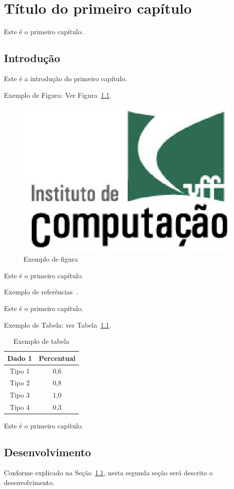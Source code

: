 \chapter{T\'itulo do primeiro cap\'itulo} \label{cap:cap1}

Este \'e o primeiro cap\'itulo. 

\section{Introdu\c{c}\~ao}\label{sec:intro}

Este \'e a introdu\c{c}\~ao do primeiro cap\'itulo. 

Exemplo de Figura: Ver Figura~\ref{fig:exefig}.

\begin{figure}[!ht]
\centering
\includegraphics[width=0.3\linewidth]{figuras/exefig.eps}
\caption{Exemplo de figura}
\label{fig:exefig}
\end{figure}

Este \'e o primeiro cap\'itulo. 

Exemplo de refer\^encias~\cite{tese2011, confinter2011, confnac2011, rev2011, site2011}.

Este \'e o primeiro cap\'itulo. 

Exemplo de Tabela: ver Tabela~\ref{tab:exetab}.

\begin{table}[!ht]
\begin{center}
\caption{Exemplo de tabela}
\label{tab:exetab}
\begin{tabular}{|c |c |}
\hline
\textbf{\textbf{Dado 1}} & \textbf{Percentual}\\
\hline\hline
Tipo 1 & 0,6 \\
Tipo 2 & 0,8 \\
Tipo 3 & 1,0 \\
Tipo 4 & 0,3 \\
\hline
\end{tabular}
\end{center}
\end{table}

Este \'e o primeiro cap\'itulo. 
 


\section{Desenvolvimento}\label{sec:desenv}

Conforme explicado na Se\c{c}\~ao~\ref{sec:intro}, nesta segunda se\c{c}\~ao ser\'a descrito o desenvolvimento.